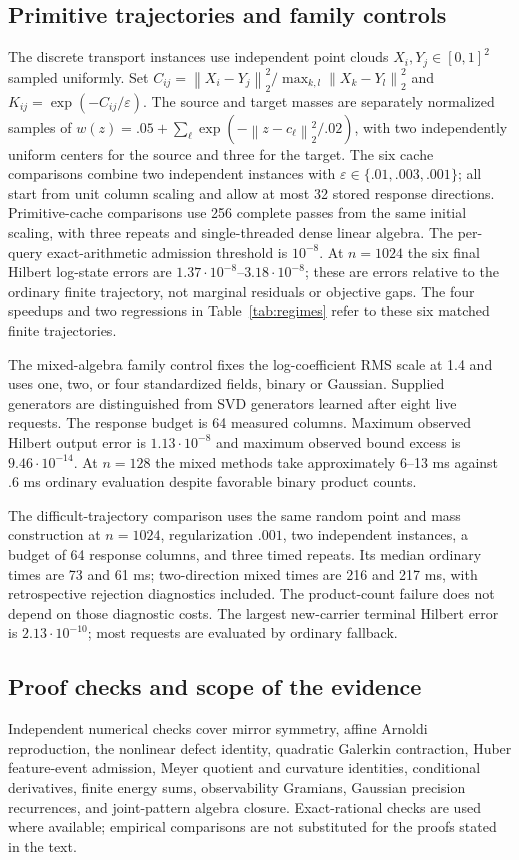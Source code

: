 \documentclass[journal]{IEEEtran}
\theoremstyle{definition}
\newcommand{\norm}[1]{\left\lVert#1\right\rVert}
\begin{document}
\subsection{Primitive trajectories and family controls}
The discrete transport instances use independent point clouds
$X_i,Y_j\in[0,1]^2$ sampled uniformly. Set
$C_{ij}=\norm{X_i-Y_j}_2^2/\max_{k,l}\norm{X_k-Y_l}_2^2$ and
$K_{ij}=\exp(-C_{ij}/\varepsilon)$.
The source and target masses are separately normalized samples of
$w(z)=.05+\sum_{\ell}\exp(-\norm{z-c_\ell}_2^2/.02)$,
with two independently uniform centers for the source and three for the
target. The six cache comparisons combine two independent instances with
$\varepsilon\in\{.01,.003,.001\}$; all start from unit column scaling
and allow at most 32 stored response directions.
Primitive-cache comparisons use 256 complete passes from the same initial
scaling, with three repeats and single-threaded dense linear algebra. The
per-query exact-arithmetic admission threshold is $10^{-8}$.
At $n=1024$ the six final Hilbert log-state errors are
$1.37\cdot10^{-8}$--$3.18\cdot10^{-8}$; these are errors relative to the
ordinary finite trajectory, not marginal residuals or objective gaps.
The four speedups and two regressions in Table~\ref{tab:regimes} refer
to these six matched finite trajectories.

The mixed-algebra family control fixes the log-coefficient RMS scale at
1.4 and uses one, two, or four standardized fields, binary or Gaussian.
Supplied generators are distinguished from SVD generators learned after
eight live requests. The response budget is 64 measured columns.
Maximum observed Hilbert output error is
$1.13\cdot10^{-8}$ and maximum observed bound excess is
$9.46\cdot10^{-14}$. At $n=128$ the mixed methods take approximately
6--13 ms against $.6$ ms ordinary evaluation despite favorable binary
product counts.

The difficult-trajectory comparison uses the same random point and mass
construction at $n=1024$, regularization $.001$, two independent instances,
a budget of 64 response columns, and three timed repeats.
Its median ordinary times are 73 and 61 ms; two-direction mixed times are
216 and 217 ms, with retrospective rejection diagnostics included.
The product-count failure does not depend on those diagnostic costs.
The largest new-carrier terminal Hilbert error is $2.13\cdot10^{-10}$;
most requests are evaluated by ordinary fallback.

\subsection{Proof checks and scope of the evidence}
Independent numerical checks cover mirror symmetry, affine Arnoldi
reproduction, the nonlinear defect identity, quadratic Galerkin contraction,
Huber feature-event admission, Meyer quotient and curvature identities,
conditional derivatives, finite energy sums, observability Gramians, Gaussian
precision recurrences, and joint-pattern algebra closure. Exact-rational
checks are used where available; empirical comparisons are not substituted
for the proofs stated in the text.
\end{document}
